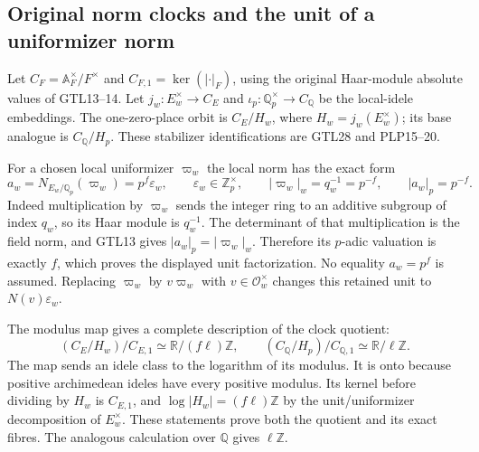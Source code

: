\subsection{Original norm clocks and the unit of a uniformizer norm}

Let $C_F=\mathbb A_F^\times/F^\times$ and
$C_{F,1}=\ker(|\cdot|_F)$, using the original Haar-module absolute
values of GTL13--14. Let $j_w:E_w^\times\to C_E$ and
$\iota_p:\mathbb Q_p^\times\to C_{\mathbb Q}$ be the local-idele
embeddings. The one-zero-place orbit is $C_E/H_w$, where
$H_w=j_w(E_w^\times)$; its base analogue is $C_{\mathbb Q}/H_p$.
These stabilizer identifications are GTL28 and PLP15--20.

For a chosen local uniformizer $\varpi_w$ the local norm has the
exact form
\begin{equation}\tag{GFC15}
 a_w=N_{E_w/\mathbb Q_p}(\varpi_w)=p^f\varepsilon_w,
 \qquad\varepsilon_w\in\mathbb Z_p^\times,\qquad
 |\varpi_w|_w=q_w^{-1}=p^{-f},\qquad |a_w|_p=p^{-f}.
\end{equation}
Indeed multiplication by $\varpi_w$ sends the integer ring to an
additive subgroup of index $q_w$, so its Haar module is $q_w^{-1}$.
The determinant of that multiplication is the field norm, and
GTL13 gives $|a_w|_p=|\varpi_w|_w$. Therefore its $p$-adic valuation
is exactly $f$, which proves the displayed unit factorization.
No equality $a_w=p^f$ is assumed. Replacing $\varpi_w$ by
$v\varpi_w$ with $v\in\mathcal O_w^\times$ changes this retained unit
to $N(v)\varepsilon_w$.

The modulus map gives a complete description of the clock quotient:
\begin{equation}\tag{GFC16}
 (C_E/H_w)/C_{E,1}\simeq
       \mathbb R/(f\ell)\mathbb Z,
 \qquad
 (C_{\mathbb Q}/H_p)/C_{\mathbb Q,1}\simeq
       \mathbb R/\ell\mathbb Z.
\end{equation}
The map sends an idele class to the logarithm of its modulus.
It is onto because positive archimedean ideles have every positive
modulus. Its kernel before dividing by $H_w$ is $C_{E,1}$, and
$\log|H_w|=(f\ell)\mathbb Z$ by the unit/uniformizer decomposition
of $E_w^\times$. These statements prove both the quotient and its
exact fibres. The analogous calculation over $\mathbb Q$ gives
$\ell\mathbb Z$.


